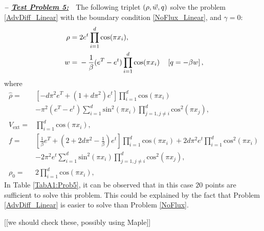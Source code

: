 \textbf{\emph{-- \underline{Test Problem 5:}}}~~The following triplet $(\rho,\vec{w},q)$ solve the problem \eqref{AdvDiff_Linear} with the boundary condition \eqref{NoFlux_Linear}, and $\gamma =0$:
\begin{align*}
\ \rho={}&2e^{t}\prod_{i=1}^{d}\text{cos}(\pi{}x_i), \\
\ w={}&-\frac{1}{\beta}(e^{T}-e^{t})\prod_{i=1}^{d}\text{cos}(\pi{}x_i)\quad\left[\adj=-\beta{}w\right],
\end{align*}
where
\begin{align*}
\ \widehat{\rho}={}&\left[-d\pi^2{}e^{T}+(1+d\pi^2)e^{t}\right]\prod_{i=1}^{d}\text{cos}(\pi{}x_i) \\
\ &-\pi^{2}(e^{T}-e^{t})\sum_{i=1}^{d}\text{sin}^2(\pi{}x_i)\prod_{j=1,j\neq{}i}^{d}\text{cos}^2(\pi{}x_j), \\
\ V_{\text{ext}}={}&\prod_{i=1}^{d}\text{cos}(\pi{}x_i), \\
\ f={}&\left[\frac{1}{\beta}e^{T}+\left(2+2d\pi^2-\frac{1}{\beta}\right)e^{t}\right]\prod_{i=1}^{d}\text{cos}(\pi{}x_i)+2d\pi^{2}e^{t}\prod_{i=1}^{d}\text{cos}^2\left(\pi{}x_i\right) \\
\ &-2\pi^{2}e^{t}\sum_{i=1}^{d}\text{sin}^2(\pi{}x_i)\prod_{j=1,j\neq{}i}^{d}\text{cos}^2(\pi{}x_j), \\
\ \rho_{0}={}&2\prod_{i=1}^{d}\text{cos}(\pi{}x_i),
\end{align*}
In Table \ref{TabA1:Prob5}, it can be observed that in this case $20$ points are sufficient to solve this problem. This could be explained by the fact that Problem \eqref{AdvDiff_Linear} is easier to solve than Problem \eqref{NoFlux}.


[[we should check these, possibly using Maple]]


